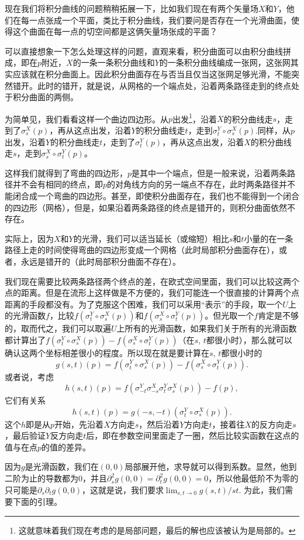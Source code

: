 \begin{para}
现在我们将积分曲线的问题稍稍拓展一下，比如我们现在有两个矢量场$X$和$Y$，他们在每一点张成一个平面，类比于积分曲线，我们要问是否存在一个光滑曲面，使得这个曲面在每一点的切空间都是这俩矢量场张成的平面？

可以直接想象一下怎么处理这样的问题，直观来看，积分曲面可以由积分曲线拼成，即在$p$附近，$X$的一条一条积分曲线和$Y$的一条积分曲线编成一张网，这张网其实应该就在积分曲面上。因此积分曲面存在与否当且仅当这张网足够光滑，不能突然错开。此时的错开，就是说，从网格的一个端点处，沿着两条路径走到的终点处于积分曲面的两侧。

为简单见，我们看看这样一个曲边四边形。从$p$出发\footnote{这就意味着我们现在考虑的是局部问题，最后的解也应该被认为是局部的。}，沿着$X$的积分曲线走$s$，走到了$\sigma^X_s(p)$，再从这点出发，沿着$Y$的积分曲线走$t$，走到$\sigma^Y_t\circ\sigma^X_s(p)$.同样，从$p$出发，沿着$Y$的积分曲线走$t$，走到了$\sigma^Y_t(p)$，再从这点出发，沿着$X$的积分曲线走$s$，走到$\sigma^X_s\circ\sigma^Y_t(p)$。

这样我们就得到了弯曲的四边形，$p$是其中一个端点，但是一般来说，沿着两条路径并不会有相同的终点，即$p$的对角线方向的另一端点不存在，此时两条路径并不能闭合成一个弯曲的四边形。甚至，即使积分曲面存在，我们也不能得到一个闭合的四边形（网格），但是，如果沿着两条路径的终点是错开的，则积分曲面依然不存在。

实际上，因为$X$和$Y$的光滑，我们可以适当延长（或缩短）相比$s$和$t$小量的在一条路径上走的时间使得弯曲的四边形变成一个网格（此时局部积分曲面存在），或者，永远是错开的（此时局部积分曲面不存在）。

我们现在需要比较两条路径两个终点的差，在欧式空间里面，我们可以比较这两个点的距离。但是在流形上这样做是不方便的，我们可能连一个很直接的计算两个点距离的手段都没有。为了克服这个困难，我们可以采用“表示”的手段，取一个$U$上的光滑函数$f$，比较$f(\sigma^Y_t\circ\sigma^X_s(p))$和$f(\sigma^X_s\circ\sigma^Y_t(p))$。但光取一个$f$肯定是不够的，取而代之，我们可以取遍$U$上所有的光滑函数，如果我们关于所有的光滑函数都计算出了$f(\sigma^Y_t\circ\sigma^X_s(p))-f(\sigma^X_s\circ\sigma^Y_t(p))$（在$s$, $t$都很小时），那么就可以确认这两个坐标相差很小的程度。所以现在就是要计算在$s$, $t$都很小时的
\[
	g(s,t)(p)=f(\sigma^Y_t\circ\sigma^X_s(p))-f(\sigma^X_s\circ\sigma^Y_t(p)).
\]
或者说，考虑
\[
	h(s,t)(p)=f(\sigma^Y_{-t}\sigma^X_{-s}\sigma^Y_{t}\sigma^X_{s}(p))-f(p),
\]
它们有关系
\[
	h(s,t)(p)=g(-s,-t)\left(\sigma^Y_t\circ\sigma^X_s(p)\right).
\]
这个$h$即是从$p$开始，先沿着$X$方向走$s$，然后沿着$Y$方向走$t$，接着往$X$的反方向走$s$，最后验证$Y$反方向走$t$后，即在参数空间里面走了一圈，然后比较实函数在这点的值与在点$p$的值的差异。

因为$g$是光滑函数，我们在$(0,0)$局部展开他，求导就可以得到系数。显然，他到二阶为止的导数都为$0$，并且$\partial_s^2g(0,0)=\partial_t^2g(0,0)=0$，所以他最低阶不为零的只可能是$\partial_s\partial_t g(0,0)$，这就是说，我们要求$\lim_{s,t\to 0}g(s,t)/st$. 为此，我们需要下面的引理。
\end{para}


